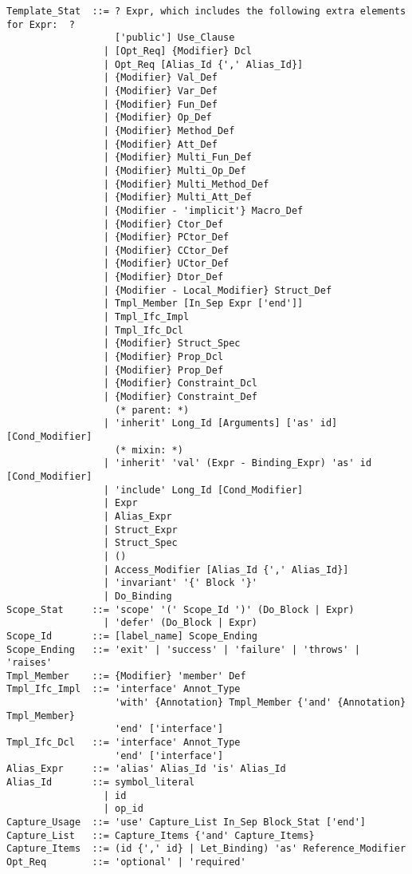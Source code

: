 \grammar\begin{lstlisting}[deletekeywords={for}]
Template_Stat  ::= ? Expr, which includes the following extra elements for Expr:  ?
                   ['public'] Use_Clause
                 | [Opt_Req] {Modifier} Dcl
                 | Opt_Req [Alias_Id {',' Alias_Id}]
                 | {Modifier} Val_Def
                 | {Modifier} Var_Def
                 | {Modifier} Fun_Def
                 | {Modifier} Op_Def
                 | {Modifier} Method_Def
                 | {Modifier} Att_Def
                 | {Modifier} Multi_Fun_Def
                 | {Modifier} Multi_Op_Def
                 | {Modifier} Multi_Method_Def
                 | {Modifier} Multi_Att_Def
                 | {Modifier - 'implicit'} Macro_Def
                 | {Modifier} Ctor_Def
                 | {Modifier} PCtor_Def
                 | {Modifier} CCtor_Def
                 | {Modifier} UCtor_Def
                 | {Modifier} Dtor_Def
                 | {Modifier - Local_Modifier} Struct_Def
                 | Tmpl_Member [In_Sep Expr ['end']]
                 | Tmpl_Ifc_Impl
                 | Tmpl_Ifc_Dcl
                 | {Modifier} Struct_Spec
                 | {Modifier} Prop_Dcl
                 | {Modifier} Prop_Def
                 | {Modifier} Constraint_Dcl
                 | {Modifier} Constraint_Def
                   (* parent: *)
                 | 'inherit' Long_Id [Arguments] ['as' id] [Cond_Modifier]
                   (* mixin: *)
                 | 'inherit' 'val' (Expr - Binding_Expr) 'as' id [Cond_Modifier]
                 | 'include' Long_Id [Cond_Modifier]
                 | Expr
                 | Alias_Expr
                 | Struct_Expr
                 | Struct_Spec
                 | ()
                 | Access_Modifier [Alias_Id {',' Alias_Id}]
                 | 'invariant' '{' Block '}'
                 | Do_Binding
Scope_Stat     ::= 'scope' '(' Scope_Id ')' (Do_Block | Expr)
                 | 'defer' (Do_Block | Expr)
Scope_Id       ::= [label_name] Scope_Ending
Scope_Ending   ::= 'exit' | 'success' | 'failure' | 'throws' | 'raises'
Tmpl_Member    ::= {Modifier} 'member' Def
Tmpl_Ifc_Impl  ::= 'interface' Annot_Type
                   'with' {Annotation} Tmpl_Member {'and' {Annotation} Tmpl_Member} 
                   'end' ['interface']
Tmpl_Ifc_Dcl   ::= 'interface' Annot_Type 
                   'end' ['interface']
Alias_Expr     ::= 'alias' Alias_Id 'is' Alias_Id
Alias_Id       ::= symbol_literal
                 | id
                 | op_id
Capture_Usage  ::= 'use' Capture_List In_Sep Block_Stat ['end']
Capture_List   ::= Capture_Items {'and' Capture_Items}
Capture_Items  ::= (id {',' id} | Let_Binding) 'as' Reference_Modifier
Opt_Req        ::= 'optional' | 'required'
\end{lstlisting}

